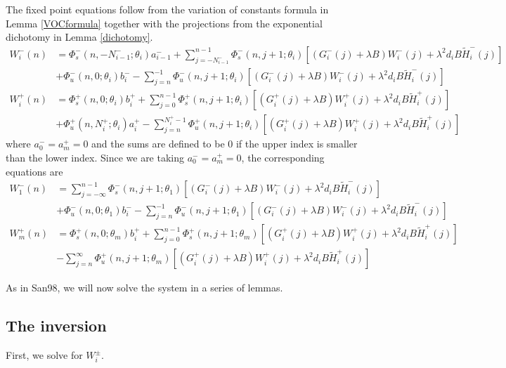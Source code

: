 \documentclass[12pt]{article}
\begin{document}
The fixed point equations follow from the variation of constants formula in Lemma \ref{VOCformula} together with the projections from the exponential dichotomy in Lemma \ref{dichotomy}.
\begin{align*}
W_i^-(n) &= 
\Phi_s^-(n, -N_{i-1}^-; \theta_i) a_{i-1}^- + \sum_{j = -N_{i-1}^-}^{n-1} \Phi_s^-(n, j+1; \theta_i)
[(G_i^-(j) + \lambda B) W_i^-(j) + \lambda^2 d_i B \tilde{H}_i^-(j)]
 \\
&+ \Phi_u^-(n, 0; \theta_i) b_i^- - \sum_{j = n}^{-1} \Phi_u^-(n, j+1; \theta_i) 
[(G_i^-(j) + \lambda B) W_i^-(j) + \lambda^2 d_i B \tilde{H}_i^-(j)] \\
W_i^+(n) &= \Phi_s^+(n, 0; \theta_i) b_i^+ + \sum_{j = 0}^{n-1} \Phi_s^+(n, j+1; \theta_i) 
[(G_i^+(j) + \lambda B) W_i^+(j) + \lambda^2 d_i B \tilde{H}_i^+(j)] \\
&+ \Phi_u^+(n, N_i^+; \theta_i) a_i^+ - \sum_{j = n}^{N_i^+-1} \Phi_u^+(n, j+1; \theta_i) 
[(G_i^+(j) + \lambda B) W_i^+(j) + \lambda^2 d_i B \tilde{H}_i^+(j)]
\end{align*}
where $a_0^- = a_m^+ = 0$ and the sums are defined to be $0$ if the upper index is smaller than the lower index. Since we are taking $a_0^- = a_m^+ = 0$, the corresponding equations are
\begin{align*}
W_1^-(n) &= \sum_{j = -\infty}^{n-1} \Phi_s^-(n, j+1; \theta_1)
[(G_i^-(j) + \lambda B) W_i^-(j) + \lambda^2 d_i B \tilde{H}_i^-(j)]
 \\
&+ \Phi_u^-(n, 0; \theta_1) b_i^- - \sum_{j = n}^{-1} \Phi_u^-(n, j+1; \theta_1) 
[(G_i^-(j) + \lambda B) W_i^-(j) + \lambda^2 d_i B \tilde{H}_i^-(j)] \\
W_m^+(n) &= \Phi_s^+(n, 0; \theta_m) b_i^+ + \sum_{j = 0}^{n-1} \Phi_s^+(n, j+1; \theta_m) 
[(G_i^+(j) + \lambda B) W_i^+(j) + \lambda^2 d_i B \tilde{H}_i^+(j)] \\
&- \sum_{j = n}^{\infty} \Phi_u^+(n, j+1; \theta_m) 
[(G_i^+(j) + \lambda B) W_i^+(j) + \lambda^2 d_i B \tilde{H}_i^+(j)]
\end{align*}

As in San98, we will now solve the system in a series of lemmas.

\subsection{The inversion}
First, we solve for $W_i^\pm$. 
\end{document}
